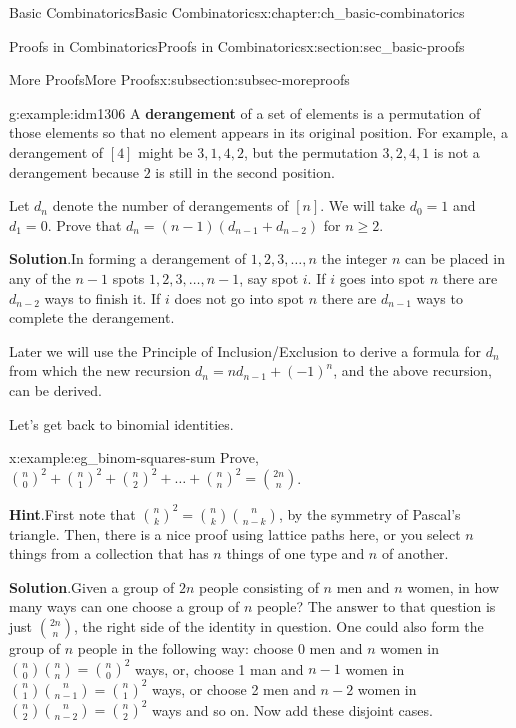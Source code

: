 \documentclass[oneside,10pt,]{book}
\newcommand{\terminology}[1]{\textbf{#1}}
\numberwithin{equation}{chapter}
\begin{document}
\begin{chapterptx}{Basic Combinatorics}{}{Basic Combinatorics}{}{}{x:chapter:ch_basic-combinatorics}
\begin{sectionptx}{Proofs in Combinatorics}{}{Proofs in Combinatorics}{}{}{x:section:sec_basic-proofs}
\begin{subsectionptx}{More Proofs}{}{More Proofs}{}{}{x:subsection:subsec-moreproofs}
\begin{example}{}{g:example:idm1306}%
A \terminology{derangement} of a set of elements is a permutation of those elements so that no element appears in its original position.  For example, a derangement of \([4]\) might be \(3,1,4,2\), but the permutation \(3,2,4,1\) is not a derangement because \(2\) is still in the second position.%
\par
Let \(d_{n}\) denote the number of derangements of \([n]\).  We will take \(d_{0} = 1\) and \(d_{1} = 0\).  Prove that \(d_{n} = (n - 1)(d_{n - 1}+ d_{n - 2})\) for \(n \geq 2\).%
\par\smallskip%
\noindent\textbf{Solution}.\hypertarget{g:solution:idm1321}{}\quad{}In forming a derangement of \(1, 2, 3, \ldots, n\) the integer \(n\) can be placed in any of the \(n - 1\) spots \(1, 2, 3, \ldots, n - 1\), say spot \(i\). If \(i\) goes into spot \(n\) there are \(d_{n - 2}\) ways to finish it. If \(i\) does not go into spot \(n\) there are \(d_{n - 1}\) ways to complete the derangement.%
\end{example}
Later we will use the Principle of Inclusion\slash{}Exclusion to derive a formula for \(d_{n}\) from which the new recursion \(d_{n} = nd_{n - 1} + \left( - 1 \right)^{n}\), and the above recursion, can be derived.%
\par
Let's get back to binomial identities.%
\begin{example}{}{x:example:eg_binom-squares-sum}%
Prove, \(\binom{n}{0}^{2} + \binom{n}{1}^{2} + \binom{n}{2}^{2} + \ldots + \binom{n}{n}^{2} = \binom{2n}{n}\).%
\par\smallskip%
\noindent\textbf{Hint}.\hypertarget{g:hint:idm1342}{}\quad{}First note that \(\binom{n}{k}^2 = \binom{n}{k}\binom{n}{n-k}\), by the symmetry of Pascal's triangle.  Then, there is a nice proof using lattice paths here, or you select \(n\) things from a collection that has \(n\) things of one type and \(n\) of another.%
\par\smallskip%
\noindent\textbf{Solution}.\hypertarget{g:solution:idm1348}{}\quad{}Given a group of \(2n\) people consisting of \(n\) men and \(n\) women, in how many ways can one choose a group of \(n\) people? The answer to that question is just \(\binom{2n}{n}\), the right side of the identity in question. One could also form the group of \(n\) people in the following way: choose 0 men and \(n\) women in \(\binom{n}{0} \binom{n}{n} = \binom{n}{0}^{2}\) ways, or, choose 1 man and \(n - 1\) women in \(\binom{n}{1} \binom{n}{n - 1} = \binom{n}{1}^{2}\) ways, or choose 2 men and \(n - 2\) women in \(\binom{n}{2} \binom{n}{n - 2} = \binom{n}{2}^{2}\) ways and so on. Now add these disjoint cases.%

\end{example}
\end{subsectionptx}
\end{sectionptx}
\end{chapterptx}
\end{document}
